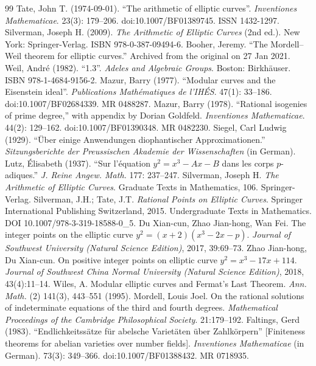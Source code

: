\documentclass[11pt]{amsart}
\begin{document}
\begin{thebibliography}{99}
 Tate, John T. (1974-09-01). ``The arithmetic of elliptic curves''. \emph{Inventiones Mathematicae}. 23(3): 179--206. doi:10.1007/BF01389745. ISSN 1432-1297.
 Silverman, Joseph H. (2009). \emph{The Arithmetic of Elliptic Curves} (2nd ed.). New York: Springer-Verlag. ISBN 978-0-387-09494-6.
 Booher, Jeremy. ``The Mordell--Weil theorem for elliptic curves.'' Archived from the original on 27 Jan 2021.
 Weil, Andr\'e (1982). ``1.3''. \emph{Adeles and Algebraic Groups}. Boston: Birkh\"auser. ISBN 978-1-4684-9156-2.
 Mazur, Barry (1977). ``Modular curves and the Eisenstein ideal''. \emph{Publications Math\'ematiques de l'IH\'ES}. 47(1): 33--186. doi:10.1007/BF02684339. MR 0488287.
 Mazur, Barry (1978). ``Rational isogenies of prime degree,'' with appendix by Dorian Goldfeld. \emph{Inventiones Mathematicae}. 44(2): 129--162. doi:10.1007/BF01390348. MR 0482230.
 Siegel, Carl Ludwig (1929). ``\"Uber einige Anwendungen diophantischer Approximationen.'' \emph{Sitzungsberichte der Preussischen Akademie der Wissenschaften} (in German).
 Lutz, \'Elisabeth (1937). ``Sur l'\'equation $y^2=x^3-Ax-B$ dans les corps $p$-adiques.'' \emph{J. Reine Angew. Math.} 177: 237--247.
 Silverman, Joseph H. \emph{The Arithmetic of Elliptic Curves}. Graduate Texts in Mathematics, 106. Springer-Verlag.
 Silverman, J.H.; Tate, J.T. \emph{Rational Points on Elliptic Curves}. Springer International Publishing Switzerland, 2015. Undergraduate Texts in Mathematics. DOI 10.1007/978-3-319-18588-0\_5.
 Du Xian-cun, Zhao Jian-hong, Wan Fei. The integer points on the elliptic curve $y^2=(x+2)(x^3-2x-p)$. \emph{Journal of Southwest University (Natural Science Edition)}, 2017, 39:69--73.
 Zhao Jian-hong, Du Xian-cun. On positive integer points on elliptic curve $y^2=x^3-17x+114$. \emph{Journal of Southwest China Normal University (Natural Science Edition)}, 2018, 43(4):11--14.
 Wiles, A. Modular elliptic curves and Fermat's Last Theorem. \emph{Ann. Math.} (2) 141(3), 443--551 (1995).
 Mordell, Louis Joel. On the rational solutions of indeterminate equations of the third and fourth degrees. \emph{Mathematical Proceedings of the Cambridge Philosophical Society}. 21:179--192.
 Faltings, Gerd (1983). ``Endlichkeitss\"atze f\"ur abelsche Variet\"aten \"uber Zahlk\"orpern'' [Finiteness theorems for abelian varieties over number fields]. \emph{Inventiones Mathematicae} (in German). 73(3): 349--366. doi:10.1007/BF01388432. MR 0718935.

\end{thebibliography}
\end{document}
